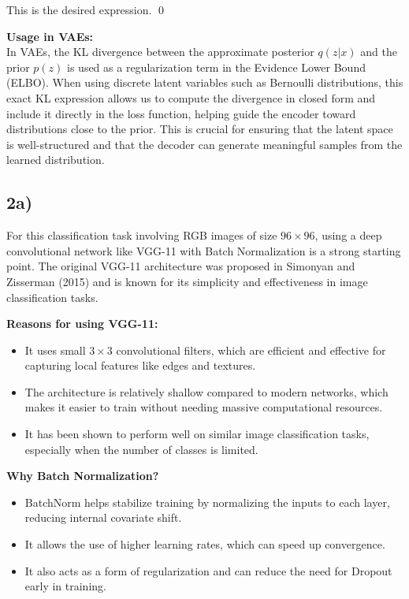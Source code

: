 \documentclass[10pt]{article}
\begin{document}
\noindent This is the desired expression. \qed

\medskip

\noindent \textbf{Usage in VAEs:} \\
In VAEs, the KL divergence between the approximate posterior \( q(z|x) \) and the prior \( p(z) \) is used as a regularization term in the Evidence Lower Bound (ELBO). When using discrete latent variables such as Bernoulli distributions, this exact KL expression allows us to compute the divergence in closed form and include it directly in the loss function, helping guide the encoder toward distributions close to the prior.
This is crucial for ensuring that the latent space is well-structured and that the decoder can generate meaningful samples from the learned distribution.
\subsection*{2a)}
For this classification task involving RGB images of size $96 \times 96$, using a deep convolutional network like VGG-11 with Batch Normalization is a strong starting point. The original VGG-11 architecture was proposed in Simonyan and Zisserman (2015) and is known for its simplicity and effectiveness in image classification tasks.

\medskip

\noindent \textbf{Reasons for using VGG-11:}
\begin{itemize}
  \item It uses small \(3 \times 3\) convolutional filters, which are efficient and effective for capturing local features like edges and textures.
  \item The architecture is relatively shallow compared to modern networks, which makes it easier to train without needing massive computational resources.
  \item It has been shown to perform well on similar image classification tasks, especially when the number of classes is limited.
\end{itemize}

\noindent \textbf{Why Batch Normalization?}
\begin{itemize}
  \item BatchNorm helps stabilize training by normalizing the inputs to each layer, reducing internal covariate shift.
  \item It allows the use of higher learning rates, which can speed up convergence.
  \item It also acts as a form of regularization and can reduce the need for Dropout early in training.
\end{itemize}
\end{document}
